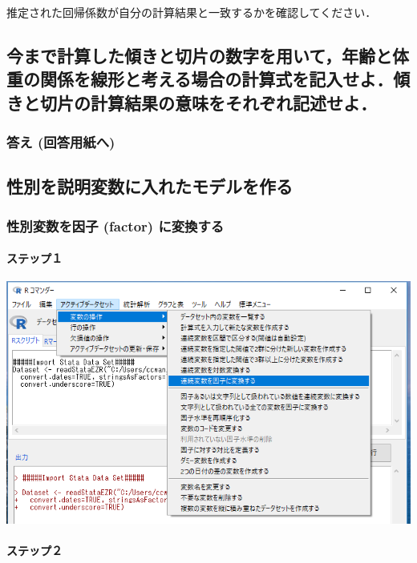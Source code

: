 \documentclass[11pt,]{problemset}
\let\oldparagraph\paragraph
\renewcommand{\paragraph}[1]{\oldparagraph{#1}\mbox{}}
\begin{document}
推定された回帰係数が自分の計算結果と一致するかを確認してください．

\subsection{今まで計算した傾きと切片の数字を用いて，年齢と体重の関係を線形と考える場合の計算式を記入せよ．傾きと切片の計算結果の意味をそれぞれ記述せよ．}

\hypertarget{--3}{%
\subsubsection{答え (回答用紙へ)}\label{--3}}

\bigskip\bigskip\bigskip\bigskip\bigskip

\subsection{性別を説明変数に入れたモデルを作る}

\hypertarget{-factor-}{%
\subsubsection{性別変数を因子 (factor) に変換する}\label{-factor-}}

\newpage

\hypertarget{-8}{%
\paragraph{ステップ１}\label{-8}}

\begin{center}\includegraphics[width=0.8\linewidth]{pic/sexfactor00} \end{center}

\hypertarget{-9}{%
\paragraph{ステップ２}\label{-9}}
\end{document}
